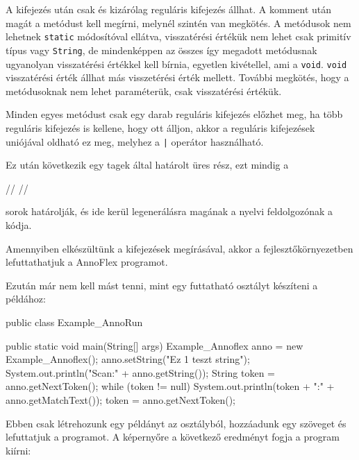 A kifejezés után csak és kizárólag reguláris kifejezés állhat. A komment után magát a metódust kell megírni, melynél szintén van megkötés. A metódusok nem lehetnek \texttt{static} módosítóval ellátva, visszatérési értékük nem lehet csak primitív típus vagy \texttt{String}, de mindenképpen az összes így megadott metódusnak ugyanolyan visszatérési értékkel kell bírnia, egyetlen kivétellel, ami a \texttt{void}. \texttt{void} visszatérési érték állhat más visszetérési érték mellett. További megkötés, hogy a metódusoknak nem lehet paraméterük, csak visszatérési értékük.

Minden egyes metódust csak egy darab reguláris kifejezés előzhet meg, ha több reguláris kifejezés is kellene, hogy ott álljon, akkor a reguláris kifejezések uniójával oldható ez meg, melyhez a \texttt{|} operátor használható.

Ez után következik egy tagek által határolt üres rész, ezt mindig a
\begin{java}
//%
//%
\end{java}
sorok határolják, és ide kerül legenerálásra magának a nyelvi feldolgozónak a kódja.

Amennyiben elkészültünk a kifejezések megírásával, akkor a fejlesztőkörnyezetben lefuttathatjuk a AnnoFlex programot.



Ezután már nem kell mást tenni, mint egy futtatható osztályt készíteni a példához:

\begin{java}
public class Example_AnnoRun {

	public static void main(String[] args) {
		Example_Annoflex anno = new Example_Annoflex();
		anno.setString("Ez 1 teszt string");
		System.out.println("Scan:" + anno.getString());
		String token = anno.getNextToken();
		while (token != null) {
			System.out.println(token + ":" + anno.getMatchText());
			token = anno.getNextToken();
		}
	}

}
\end{java}

Ebben csak létrehozunk egy példányt az osztályból, hozzáadunk egy szöveget és lefuttatjuk a programot. A képernyőre a következő eredményt fogja a program kiírni:

